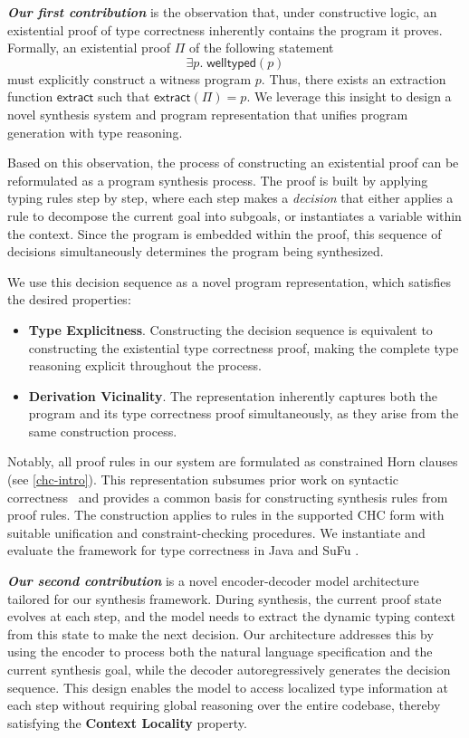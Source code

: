 \documentclass[manuscript,screen]{acmart}
\begin{document}
\textbf{\textit{Our first contribution}} is the observation that, under constructive logic, an existential proof of type correctness inherently contains the program it proves. Formally, an existential proof $\Pi$ of the following statement
\[
\exists p.\; \mathsf{welltyped}(p)
\]
must explicitly construct a witness program $p$. Thus, there exists an extraction function $\mathsf{extract}$ such that $\mathsf{extract}(\Pi) = p$. We leverage this insight to design a novel synthesis system and program representation that unifies program generation with type reasoning.

Based on this observation, the process of constructing an existential proof can be reformulated as a program synthesis process. The proof is built by applying typing rules step by step, where each step makes a \textit{decision} that either applies a rule to decompose the current goal into subgoals, or instantiates a variable within the context. Since the program is embedded within the proof, this sequence of decisions simultaneously determines the program being synthesized.

We use this decision sequence as a novel program representation, which satisfies the desired properties:
\begin{itemize}
    \item \textbf{Type Explicitness}. Constructing the decision sequence is equivalent to constructing the existential type correctness proof, making the complete type reasoning explicit throughout the process.
    \item \textbf{Derivation Vicinality}. The representation inherently captures both the program and its type correctness proof simultaneously, as they arise from the same construction process.
\end{itemize}

Notably, all proof rules in our system are formulated as constrained Horn clauses (see \autoref{chc-intro}). This representation    {\color{revblue}subsumes } prior work on syntactic correctness~\cite{DBLP:conf/icse/ZhuL000C24,DBLP:conf/acl/LiangZ0LLXCZZZC25}    {\color{revblue}and provides a common basis for constructing synthesis rules from proof rules. The construction applies to rules in the supported CHC form with suitable unification and constraint-checking procedures. We instantiate and evaluate the framework for type correctness in Java and SuFu} .

\textbf{\textit{Our second contribution}} is a novel encoder-decoder model architecture tailored for our synthesis framework. During synthesis, the current proof state evolves at each step, and the model needs to extract the dynamic typing context from this state to make the next decision. Our architecture addresses this by using the encoder to process both the natural language specification and the current synthesis goal, while the decoder autoregressively generates the decision sequence. This design enables the model to access localized type information at each step without requiring global reasoning over the entire codebase, thereby satisfying the \textbf{Context Locality} property.
\end{document}

